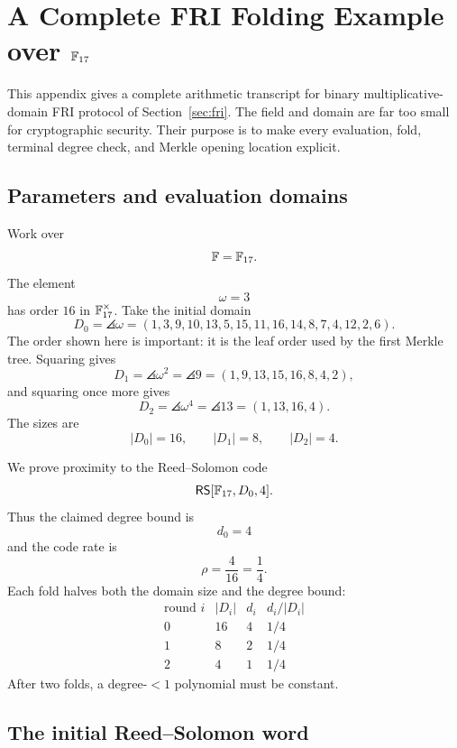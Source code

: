\section{A Complete FRI Folding Example over \texorpdfstring{$\mathbb{F}_{17}$}{F17}}
\label{app:fri-example}

This appendix gives a complete arithmetic transcript for binary multiplicative-domain FRI
protocol of Section~\ref{sec:fri}. The field and domain are far too small for cryptographic
security. Their purpose is to make every evaluation, fold, terminal degree check, and Merkle
opening location explicit.

\subsection{Parameters and evaluation domains}

Work over
\[
    \mathbb{F}=\mathbb{F}_{17}.
\]
The element
\[
    \omega=3
\]
has order $16$ in $\mathbb{F}_{17}^{\times}$. Take the initial domain
\[
    D_0=\angles{\omega}
       =(1,3,9,10,13,5,15,11,16,14,8,7,4,12,2,6).
\]
The order shown here is important: it is the leaf order used by the first Merkle tree.
Squaring gives
\[
    D_1=\angles{\omega^2}
       =\angles{9}
       =(1,9,13,15,16,8,4,2),
\]
and squaring once more gives
\[
    D_2=\angles{\omega^4}
       =\angles{13}
       =(1,13,16,4).
\]
The sizes are
\[
    |D_0|=16,
    \qquad
    |D_1|=8,
    \qquad
    |D_2|=4.
\]

We prove proximity to the Reed--Solomon code
\[
    \mathsf{RS}[\mathbb{F}_{17},D_0,4].
\]
Thus the claimed degree bound is
\[
    d_0=4
\]
and the code rate is
\[
    \rho=\frac{4}{16}=\frac14.
\]
Each fold halves both the domain size and the degree bound:
\[
\begin{array}{c|c|c|c}
\text{round }i & |D_i| & d_i & d_i/|D_i|\\
\hline
0 & 16 & 4 & 1/4\\
1 & 8 & 2 & 1/4\\
2 & 4 & 1 & 1/4
\end{array}
\]
After two folds, a degree-$<1$ polynomial must be constant.

\subsection{The initial Reed--Solomon word}

